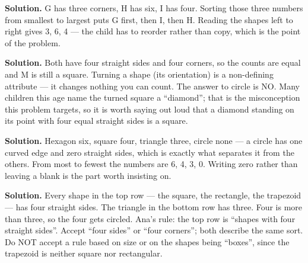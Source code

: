 \documentclass[12pt]{article}
\begin{document}


\textbf{Solution.} G has three corners, H has six, I has four. Sorting those three numbers from smallest to largest puts G first, then I, then H. Reading the shapes left to right gives 3, 6, 4 --- the child has to reorder rather than copy, which is the point of the problem.



\textbf{Solution.} Both have four straight sides and four corners, so the counts are equal and M is still a square. Turning a shape (its orientation) is a non-defining attribute --- it changes nothing you can count. The answer to circle is NO. Many children this age name the turned square a ``diamond''; that is the misconception this problem targets, so it is worth saying out loud that a diamond standing on its point with four equal straight sides is a square.



\textbf{Solution.} Hexagon six, square four, triangle three, circle none --- a circle has one curved edge and zero straight sides, which is exactly what separates it from the others. From most to fewest the numbers are 6, 4, 3, 0. Writing zero rather than leaving a blank is the part worth insisting on.



\textbf{Solution.} Every shape in the top row --- the square, the rectangle, the trapezoid --- has four straight sides. The triangle in the bottom row has three. Four is more than three, so the four gets circled. Ana's rule: the top row is ``shapes with four straight sides''. Accept ``four sides'' or ``four corners''; both describe the same sort. Do NOT accept a rule based on size or on the shapes being ``boxes'', since the trapezoid is neither square nor rectangular.
\end{document}
